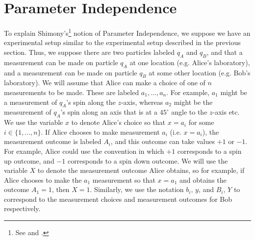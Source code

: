 \documentclass[12pt]{report}
\begin{document}
\section{Parameter Independence\label{PISec}}
To explain Shimony's\footnote{See \cite[146-147]{Shimony86} and \cite[7-9]{Butterfield}.}  notion of  Parameter Independence, we suppose we have an experimental setup similar to the experimental setup described in the previous section. Thus, we suppose there are two particles labeled $q_A$ and $q_B$, and that a measurement can be made on particle  $q_A$ at one location (e.g. Alice's laboratory), and a measurement can be made on particle $q_B$ at some other location (e.g. Bob's laboratory). We will assume that Alice can make a choice of one of $n$ measurements to be made. These are labeled $a_1,\ldots, a_n$.  %
%
For example, $a_1$ might be a measurement of $q_A$'s spin along the $z$-axis, whereas $a_2$ might be the measurement of $q_A$'s spin along an axis that is at  a $45^\circ$ angle to the $z$-axis etc. We use the variable $x$ to denote Alice's choice so that $x=a_i$ for some $i\in\{1,\ldots,n\}$. If Alice chooses to make measurement $a_i$ (i.e. $x=a_i$), the measurement outcome is labeled $A_i$,  %
%
and this outcome can take values $+1$ or $-1$. For example, Alice could use the convention in which $+1$ corresponds to a spin up outcome, and $-1$ corresponds to a spin down outcome. We will use the variable $X$ to denote the measurement outcome Alice obtains, %
%
so for example, if Alice chooses to make the $a_1$ measurement so that $x=a_1$ and obtains the outcome $A_1=1$, then $X=1$. Similarly, we use the notation $b_i,\, y$,  %
%
and  %
%
$B_i,\, Y$ %
%
to correspond to the measurement choices and measurement outcomes for Bob respectively.
\end{document}
